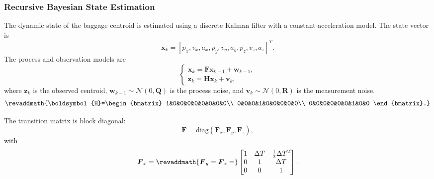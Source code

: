 \subsubsection{Recursive Bayesian State Estimation}
The dynamic state of the baggage centroid is estimated using a discrete Kalman filter with a constant-acceleration model. The state vector is
\begin{equation}
\boldsymbol{x}_{k}=[p_x,v_x,a_x,p_y,v_y,a_y,p_z,v_z,a_z]^T.
\end{equation}
The process and observation models are
\begin{equation}
\begin{cases}
\boldsymbol{x}_{k}=\boldsymbol{F}\boldsymbol{x}_{k-1}+\boldsymbol{w}_{k-1},\\
\boldsymbol{z}_{k}=\boldsymbol{H}\boldsymbol{x}_{k}+\boldsymbol{v}_{k},
\end{cases}
\label{eq:state}
\end{equation}
where $\boldsymbol{z}_{k}$ is the observed centroid, $\boldsymbol{w}_{k-1}\sim\mathcal{N}(0,\boldsymbol{Q})$ is the process noise, and $\boldsymbol{v}_{k}\sim\mathcal{N}(0,\boldsymbol{R})$ is the measurement noise. 
\[
\revaddmath{\boldsymbol{H}=\begin{bmatrix}
1&0&0&0&0&0&0&0&0\\
0&0&0&1&0&0&0&0&0\\
0&0&0&0&0&0&1&0&0
\end{bmatrix}.}
\]
\noindent{}\par
The transition matrix is block diagonal:
\begin{equation}
\boldsymbol{F}=\mathrm{diag}(\boldsymbol{F}_{x},\boldsymbol{F}_{y},\boldsymbol{F}_{z}),
\end{equation}
with
\begin{equation}
\boldsymbol{F}_{x}=\revaddmath{\boldsymbol{F}_{y}=\boldsymbol{F}_{z}=}\begin{bmatrix}
1 & \Delta T & \frac{1}{2}\Delta T^{2}\\
0 & 1 & \Delta T\\
0 & 0 & 1
\end{bmatrix}.
\label{eq:fx}
\end{equation}
\noindent{}\par

